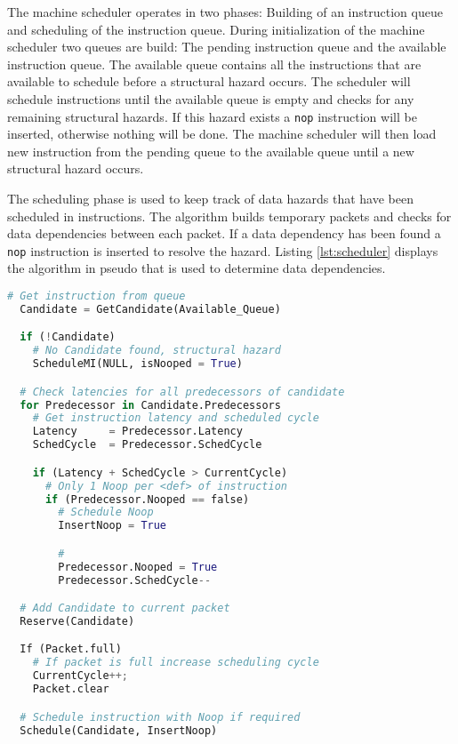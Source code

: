 The machine scheduler operates in two phases: Building of an instruction queue and scheduling of the instruction queue.
During initialization of the machine scheduler two queues are build: The pending instruction queue and the available instruction queue. The available queue contains all the instructions that are available to schedule before a structural hazard occurs. The scheduler will schedule instructions until the available queue is empty and checks for any remaining structural hazards. If this hazard exists a \texttt{nop} instruction will be inserted, otherwise nothing will be done. The machine scheduler will then load new instruction from the pending queue to the available queue until a new structural hazard occurs.

The scheduling phase is used to keep track of data hazards that have been scheduled in instructions. The algorithm builds temporary packets and checks for data dependencies between each packet. If a data dependency has been found a \texttt{nop} instruction is inserted to resolve the hazard. Listing \ref{lst:scheduler} displays the algorithm in pseudo that is used to determine data dependencies. 


\begin{lstlisting}[language=python,label=lst:scheduler]
  # Get instruction from queue
  Candidate = GetCandidate(Available_Queue)

  if (!Candidate)
    # No Candidate found, structural hazard
    ScheduleMI(NULL, isNooped = True)

  # Check latencies for all predecessors of candidate
  for Predecessor in Candidate.Predecessors
    # Get instruction latency and scheduled cycle
    Latency     = Predecessor.Latency
    SchedCycle  = Predecessor.SchedCycle   

    if (Latency + SchedCycle > CurrentCycle)
      # Only 1 Noop per <def> of instruction
      if (Predecessor.Nooped == false)
        # Schedule Noop
        InsertNoop = True

        #                   
        Predecessor.Nooped = True
        Predecessor.SchedCycle--          

  # Add Candidate to current packet
  Reserve(Candidate)                       

  If (Packet.full)
    # If packet is full increase scheduling cycle
    CurrentCycle++;                        
    Packet.clear                           

  # Schedule instruction with Noop if required     
  Schedule(Candidate, InsertNoop)           

\end{lstlisting}

